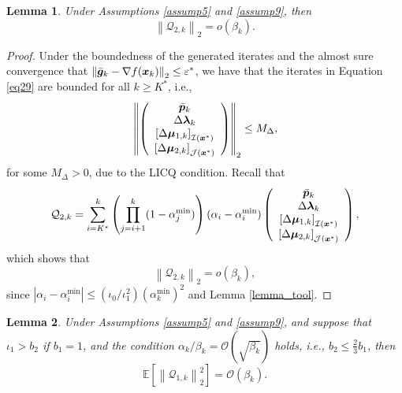 \documentclass[aos]{imsart}
\numberwithin{equation}{section}
\theoremstyle{plain}
\newtheorem{lemma}{Lemma}
\begin{document}
\begin{appendix}
\begin{lemma}
\label{lemma16}
    Under Assumptions \ref{assump5} and  \ref{assump9}, 
    then 
    \begin{equation*}
        \left\|\mathcal{Q}_{2,k} \right\|_2 = o\left( \beta_k \right).
    \end{equation*}
\end{lemma}

\begin{proof}
    Under the boundedness of the generated iterates and the almost sure convergence that $\left\| \Bar{\bm{g}}_k - \nabla f(\bm{x}_k) \right\|_2 \leq \varepsilon^{*}$, we have that the iterates in Equation \eqref{eq29} are bounded for all $k \geq K^{*}$, i.e., 
    \begin{equation*}
        \left\| \left( \begin{array}{c}
        \Bar{\bm{p}}_k \\
        \Delta \bm{\lambda}_{k}\\
        \left[\Delta \bm{\mu}_{1,k} \right]_{\mathcal{I}(\bm{x}^{*})} \\
        \left[\Delta \bm{\mu}_{2,k} \right]_{\mathcal{J}(\bm{x}^{*})}
    \end{array} \right) \right\|_2 \leq M_{\Delta},
    \end{equation*}
    for some $M_{\Delta} > 0$, due to the LICQ condition. Recall that 
    \begin{equation*}
        \mathcal{Q}_{2,k} = \sum_{i=K^{*}}^{k} \left( \prod_{j=i+1}^{k} (1-\alpha^{\min}_j) \right) (\alpha_i - \alpha^{\min}_i) \left( \begin{array}{c}
        \Bar{\bm{p}}_k \\
        \Delta \bm{\lambda}_{k}\\
        \left[\Delta \bm{\mu}_{1,k} \right]_{\mathcal{I}(\bm{x}^{*})} \\
        \left[\Delta \bm{\mu}_{2,k} \right]_{\mathcal{J}(\bm{x}^{*})}
        \end{array} \right),
    \end{equation*}
    which shows that
    \begin{equation*}
        \left\| \mathcal{Q}_{2,k} \right\|_2 = o\left( \beta_k \right),
    \end{equation*}
    since $|\alpha_i - \alpha^{\min}_i| \leq (\iota_0/\iota_1^2) (\alpha^{\min}_k)^2$ and Lemma \ref{lemma_tool}.
\end{proof}


\begin{lemma}
\label{lemma27}
Under Assumptions \ref{assump5} and  \ref{assump9}, and suppose that $\iota_1>b_2$ if $b_1=1$, and the condition $\alpha_k / \beta_k = \mathcal{O} \left( \sqrt{\beta_k} \right)$ holds, i.e., $b_2 \leq \frac{2}{3} b_1$, then
    \begin{equation}
        \mathbb{E} \left[\left\| \mathcal{Q}_{1,k}\right\|_2^2 \right] = \mathcal{O} \left( \beta_k \right).
    \end{equation}
\end{lemma}



\end{appendix}
\end{document}
